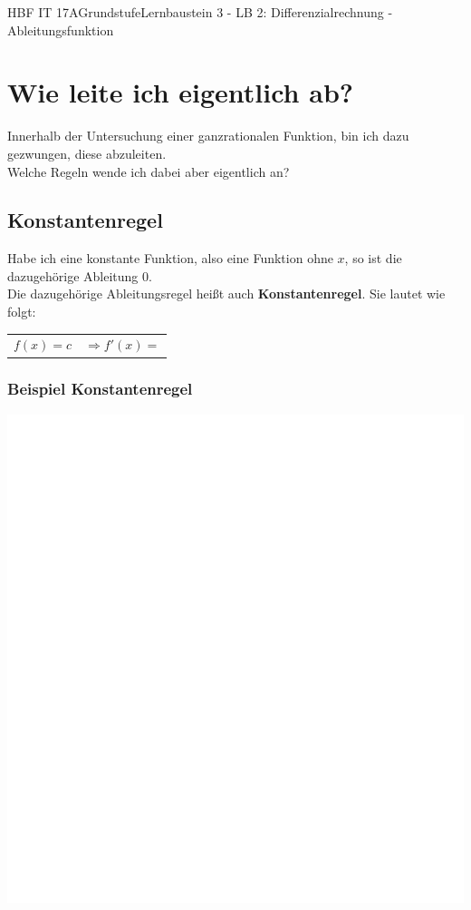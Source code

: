 \documentclass[11pt,twocolumn,oneside,openany,headings=optiontotoc,11pt,numbers=noenddot]{article}
\begin{document}
	\begin{worksheet}{HBF IT 17A}{Grundstufe}{Lernbaustein 3 - LB 2: Differenzialrechnung - Ableitungsfunktion}
		\section{Wie leite ich eigentlich ab?}
		Innerhalb der Untersuchung einer ganzrationalen Funktion, bin ich dazu gezwungen, diese abzuleiten.\\
		Welche Regeln wende ich dabei aber eigentlich an?
		\subsection{Konstantenregel}
		Habe ich eine konstante Funktion, also eine Funktion ohne \(x\), so ist die dazugehörige Ableitung \(0\).\\
		Die dazugehörige Ableitungsregel heißt auch \textbf{Konstantenregel}. Sie lautet wie folgt:
		\begin{framed}
			\noindent
			\begin{tabularx}{0.7\textwidth}{XX}
				\(f(x) = c\) & \(\Rightarrow f'(x) = \)\\
			\end{tabularx}
		\end{framed}
		\subsubsection*{Beispiel Konstantenregel}
		\includegraphics[scale=0.2]{../empty.jpg}\\

\end{worksheet}
\end{document}
